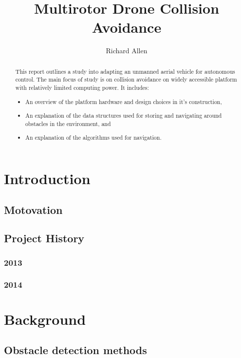 \documentclass[a4paper, 12pt, titlepage]{article}
\title{Multirotor Drone Collision Avoidance}
\author{Richard Allen}
\begin{document}


\begin{abstract}
    This report outlines a study into adapting an unmanned aerial vehicle for autonomous control. The main focus of study is on collision avoidance on widely accessible platform with relatively limited computing power. 
    It includes: 
    \begin{itemize}
        \item An overview of the platform hardware and design choices in it's construction,
        \item An explanation of the data structures used for storing and navigating around obstacles in the environment, and
        \item An explanation of the algorithms used for navigation.
    \end{itemize} 
\end{abstract}

\tableofcontents
\newpage

\section{Introduction}
	\subsection{Motovation}

	\subsection{Project History}
		\subsubsection{2013}
		\subsubsection{2014}

\section{Background}
    \subsection{Obstacle detection methods}
\end{document}
